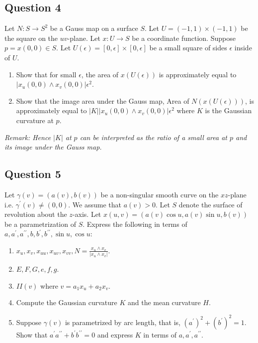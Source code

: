 \documentclass[12pt, a4paper]{article}
\begin{document}
\subsection*{Question 4}
Let $N:S\rightarrow S^{2}$ be a Gauss map on a surface $S$. Let $U=(-1,1)\times(-1,1)$ be the square on the $uv$-plane. Let $x: U\rightarrow S$ be a coordinate function. Suppose $p=x(0,0)\in S$. Let $U(\epsilon)=[0,\epsilon]\times[0,\epsilon]$ be a small square of sides $\epsilon$ inside of $U$.
\begin{enumerate}[label=(\roman*)]
    \item Show that for small $\epsilon$, the area of $x(U(\epsilon))$ is approximately equal to $|x_{u}(0,0)\wedge x_{v}(0,0)|\epsilon^{2}$.
    \item Show that the image area under the Gauss map, Area of $N(x(U(\epsilon)))$, is approximately equal to $|K| |x_{u}(0,0)\wedge x_{v}(0,0)|\epsilon^{2}$ where $K$ is the Gaussian curvature at $p$.
\end{enumerate}
\vspace{1em}
\noindent\textit{Remark: Hence $|K|$ at $p$ can be interpreted as the ratio of a small area at $p$ and its image under the Gauss map.}
\newpage

\subsection*{Question 5}
Let $\gamma(v)=(a(v),b(v))$ be a non-singular smooth curve on the $xz$-plane i.e. $\gamma^{\prime}(v)\ne(0,0)$. We assume that $a(v)>0$. Let $S$ denote the surface of revolution about the $z$-axis. Let $x(u,v)=(a(v)\cos u,a(v)\sin u,b(v))$ be a parametrization of $S$.
Express the following in terms of $a,a^{\prime},a^{\prime\prime},b,b^{\prime},b^{\prime\prime},\sin u,\cos u$:
\begin{enumerate}[label=(\roman*)]
    \item $x_{u},x_{v},x_{uu},x_{uv},x_{vv},N=\frac{x_{u}\wedge x_{v}}{|x_{u}\wedge x_{v}|}$.
    \item $E,F,G,e,f,g$.
    \item $II(v)$ where $v=a_{1}x_{u}+a_{2}x_{v}$.
    \item Compute the Gaussian curvature $K$ and the mean curvature $H$.
    \item Suppose $\gamma(v)$ is parametrized by arc length, that is, $(a^{\prime})^{2}+(b^{\prime})^{2}=1$. Show that $a^{\prime}a^{\prime\prime}+b^{\prime}b^{\prime\prime}=0$ and express $K$ in terms of $a,a^{\prime},a^{\prime\prime}$.
\end{enumerate}
\newpage
\end{document}
